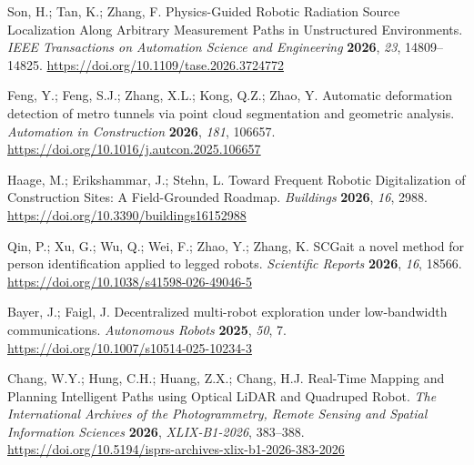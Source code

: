 Son, H.; Tan, K.; Zhang, F. Physics-Guided Robotic Radiation Source Localization Along Arbitrary Measurement Paths in Unstructured Environments. \emph{IEEE Transactions on Automation Science and Engineering} \textbf{2026}, \emph{23}, 14809--14825. \url{https://doi.org/10.1109/tase.2026.3724772}

Feng, Y.; Feng, S.J.; Zhang, X.L.; Kong, Q.Z.; Zhao, Y. Automatic deformation detection of metro tunnels via point cloud segmentation and geometric analysis. \emph{Automation in Construction} \textbf{2026}, \emph{181}, 106657. \url{https://doi.org/10.1016/j.autcon.2025.106657}

Haage, M.; Erikshammar, J.; Stehn, L. Toward Frequent Robotic Digitalization of Construction Sites: A Field-Grounded Roadmap. \emph{Buildings} \textbf{2026}, \emph{16}, 2988. \url{https://doi.org/10.3390/buildings16152988}

Qin, P.; Xu, G.; Wu, Q.; Wei, F.; Zhao, Y.; Zhang, K. SCGait a novel method for person identification applied to legged robots. \emph{Scientific Reports} \textbf{2026}, \emph{16}, 18566. \url{https://doi.org/10.1038/s41598-026-49046-5}

Bayer, J.; Faigl, J. Decentralized multi-robot exploration under low-bandwidth communications. \emph{Autonomous Robots} \textbf{2025}, \emph{50}, 7. \url{https://doi.org/10.1007/s10514-025-10234-3}

Chang, W.Y.; Hung, C.H.; Huang, Z.X.; Chang, H.J. Real-Time Mapping and Planning Intelligent Paths using Optical LiDAR and Quadruped Robot. \emph{The International Archives of the Photogrammetry, Remote Sensing and Spatial Information Sciences} \textbf{2026}, \emph{XLIX-B1-2026}, 383--388. \url{https://doi.org/10.5194/isprs-archives-xlix-b1-2026-383-2026}
